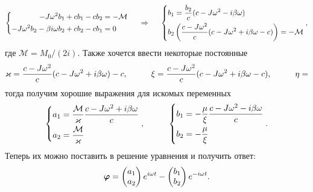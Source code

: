 \begin{equation*}
    \left\{\begin{aligned}
        - J \omega^2 b_1 + c b_1 - c b_2 &= - \mathcal M \\
        - J \omega^2 b_2 - \beta i \omega b_2 + c b_2 - c b_1 &= 0
    \end{aligned}\right.
    \hspace{0.5cm} \Rightarrow \hspace{0.5cm}
    \left\{\begin{aligned}
        &b_1 = \frac{b_2}{c} (c - J \omega^2 - i \beta \omega) \\
        &b_2 \left(\frac{c - J \omega^2}{c} (c - J \omega^2 + i \beta \omega - c)\right) = - \mathcal M
    \end{aligned}\right.
    ,
\end{equation*}
где $\mathcal M = M_0 / (2 i)$. Также хочется ввести некоторые постоянные
\begin{equation*}
    \kappa = \frac{c - J \omega^2}{c} (c - J \omega^2 + i \beta \omega) - c,
    \hspace{1 cm}
    \xi = \frac{c - J \omega^2}{c} (c - J \omega^2 + i \beta \omega - c),
    \hspace{1 cm}
    \eta = 
\end{equation*}
тогда получим хорошие выражения для искомых переменных
\begin{equation*}
    \left\{\begin{aligned}
        a_1 &= \frac{\mathcal M}{\kappa} \frac{c - J \omega^2 + i \beta \omega}{c} \\
        a_2 &= \frac{\mathcal M}{\kappa}
    \end{aligned}\right.
    , \hspace{1 cm}
    \left\{\begin{aligned}
         b_1 &= - \frac{\mu}{\xi} \frac{c - J \omega^2 - i \beta \omega}{c} \\
       b_2 &= - \frac{\mu}{\xi}
    \end{aligned}\right. .
\end{equation*}
Теперь их можно поставить в решение уравнения и получить ответ:
\begin{equation*}
    \vc{\varphi} = \begin{pmatrix}
        a_1 \\ a_2
    \end{pmatrix} e^{i\omega t} - 
    \begin{pmatrix}
        b_1 \\ b_2
    \end{pmatrix} e^{-i\omega t}.
\end{equation*}